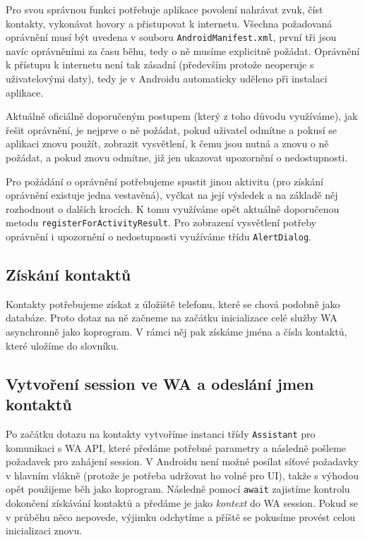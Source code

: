 Pro svou správnou funkci potřebuje aplikace povolení nahrávat zvuk, číst
kontakty, vykonávat hovory a přistupovat k internetu. Všechna požadovaná
oprávnění musí být uvedena v souboru \texttt{AndroidManifest.xml}, první
tři jsou navíc oprávněními za času běhu, tedy o ně musíme explicitně
požádat. Oprávnění k přístupu k internetu není tak zásadní (především
protože neoperuje s uživatelovými daty), tedy je v Androidu automaticky
uděleno při instalaci aplikace.

Aktuálně oficiálně doporučeným postupem (který z toho důvodu využíváme), jak
řešit oprávnění, je nejprve o ně požádat, pokud uživatel odmítne a pokusí se
aplikaci znovu použít, zobrazit vysvětlení, k čemu jsou nutná a znovu o ně
požádat, a pokud znovu odmítne, již jen ukazovat upozornění o nedostupnosti.

Pro požádání o oprávnění potřebujeme spustit jinou aktivitu (pro získání
oprávnění existuje jedna vestavěná), vyčkat na její výsledek a na základě
něj rozhodnout o dalších krocích. K tomu využíváme opět aktuálně doporučenou
metodu \texttt{registerForActivityResult}. Pro zobrazení vysvětlení potřeby
oprávnění i upozornění o nedostupnosti využíváme třídu \texttt{AlertDialog}.

\subsection{Získání kontaktů}

Kontakty potřebujeme získat z úložiště telefonu, které se chová podobně jako
databáze. Proto dotaz na ně začneme na začátku inicializace celé služby WA
asynchronně jako koprogram. V rámci něj pak získáme jména a čísla kontaktů,
které uložíme do slovníku.

\subsection{Vytvoření session ve WA a odeslání jmen kontaktů}

Po začátku dotazu na kontakty vytvoříme instanci třídy \texttt{Assistant}
pro komunikaci s WA API, které předáme potřebné parametry a následně pošleme
požadavek pro zahájení session. V Androidu není možné posílat síťové požadavky
v hlavním vlákně (protože je potřeba udržovat ho volné pro UI), takže s výhodou
opět použijeme běh jako koprogram. Následně pomocí \texttt{await} zajistíme
kontrolu dokončení získávání kontaktů a předáme je jako \textit{kontext} do
WA session. Pokud se v průběhu něco nepovede, výjimku odchytíme a příště
se pokusíme provést celou inicializaci znovu.

